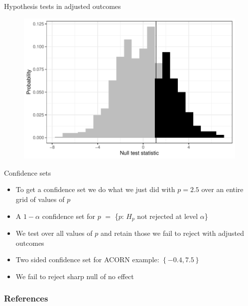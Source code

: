 \documentclass[table, xcolor = {dvipsnames}, 9pt]{beamer}
\theoremstyle{plain}
\begin{document}
\begin{frame}{Hypothesis tests in adjusted outcomes}
\begin{figure}[H]
\includegraphics[width=0.9\linewidth]{null_unif_plot.pdf}
\end{figure}
\end{frame}
\begin{frame}{Confidence sets}
\vfill
\begin{itemize} \vfill
\item To get a confidence set we do what we just did with $p = 2.5$ over an entire grid of values of $p$ \vfill
\item A $1-\alpha$ confidence set for $p$ $= $ \{$p$: $H_{p}$ not rejected at level $\alpha$\} \vfill
\item We test over all values of $p$ and retain those we fail to reject with adjusted outcomes \vfill
\item Two sided confidence set for ACORN example: $\left\{-0.4, 7.5\right\}$ \vfill
\item We fail to reject sharp null of no effect \vfill
\end{itemize}
\end{frame}
\begin{frame}[allowframebreaks]
\frametitle{References} 
\scriptsize

\end{frame}
\end{document}

